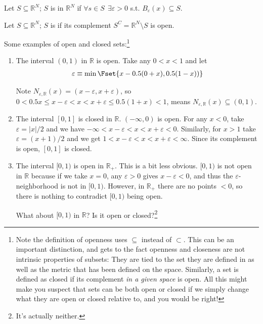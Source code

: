 \documentclass{article}
\begin{document}
\begin{definition}[open]\label{def:lecture1_open_set}
  Let $S \subseteq \mathbb{R}^{N}$; $S$ is  in $\mathbb{R}^N$ if $\forall s \in S ~~ \exists \varepsilon > 0$ s.t. $B_{\varepsilon}(x) \subseteq S$.
\end{definition}

\begin{definition}[closed]\label{def:lecture1_closed_set}
  Let $S \subseteq \mathbb{R}^{N}$; $S$ is  if its complement $S^C = \mathbb{R}^N \setminus S$ is open.
\end{definition}

Some examples of open and closed sets:\footnote{Note the definition of openness uses $\subseteq$ instead of $\subset$. This can be an important distinction, and gets to the fact openness and closeness are not intrinsic properties of subsets: They are tied to the set they are defined in as well as the metric that has been defined on the space. Similarly, a set is defined as closed if its complement \textit{in a given space} is open. All this might make you suspect that sets can be both open or closed if we simply change what they are open or closed relative to, and you would be right!}
\begin{enumerate}
  \item The interval $(0, 1)$ in $\mathbb{R}$ is open. Take any $0 < x < 1$ and let
    \begin{align*}
      \varepsilon \equiv \min\Fset{x - 0.5 (0 + x), 0.5 (1 - x))}
    \end{align*}

    Note $N_{\varepsilon, \mathbb{R}}(x) = (x - \varepsilon, x + \varepsilon)$, so $0 < 0.5x \le x - \varepsilon < x < x + \varepsilon \le 0.5(1 + x) < 1$, means $N_{\varepsilon, \mathbb{R}}(x) \subseteq (0, 1)$.

  \item The interval $[0, 1]$ is closed in $\mathbb{R}$. $(-\infty, 0)$ is open. For any $x < 0$, take $\varepsilon = |x| / 2$ and we have $-\infty < x - \varepsilon < x < x + \varepsilon < 0$. Similarly, for $x > 1$ take $\varepsilon = (x + 1) / 2$ and we get $1 < x - \varepsilon < x < x + \varepsilon < \infty$. Since its complement is open, $[0, 1]$ is closed.

  \item The interval $[0, 1)$ is open in $\mathbb{R}_+$. This is a bit less obvious. $[0, 1)$ is not open in $\mathbb{R}$ because if we take $x = 0$, any $\varepsilon > 0$ gives $x - \varepsilon < 0$, and thus the $\varepsilon$-neighborhood is not in $[0, 1)$. However, in $\mathbb{R}_+$ there are no points $< 0$, so there is nothing to contradict $[0, 1)$ being open.

    What about $[0, 1)$ in $\mathbb{R}$? Is it open or closed?\footnote{It's actually neither.}
\end{enumerate}
\end{document}
